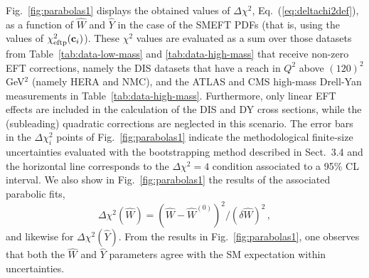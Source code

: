 \documentclass[withindex,glossary]{cam-thesis}
\begin{document}
Fig.~\ref{fig:parabolas1} displays the obtained values of $\Delta \chi^2$, Eq.~(\ref{eq:deltachi2def}),
as a function of $\hat{W}$ 
and $\hat{Y}$ in the case of the SMEFT PDFs (that is, using
the values of $\chi_{\rm eftp}^2({\mathbf{c}_i})$).
%
These $\chi^2$ values are  evaluated as a sum over
those datasets from Table~\ref{tab:data-low-mass} and
\ref{tab:data-high-mass} that receive
non-zero EFT corrections, namely the DIS datasets that
have a reach in  $Q^2$ above $(120)^2$ GeV$^2$ (namely HERA and NMC), and the ATLAS and CMS high-mass Drell-Yan measurements in Table~\ref{tab:data-high-mass}.
%
Furthermore, only linear EFT effects are included in the calculation of the DIS and DY 
cross sections, while the (subleading) quadratic corrections are neglected
in this scenario.
%
The error bars in the $\Delta\chi^2_i$ points of
Fig.~\ref{fig:parabolas1} indicate the
methodological finite-size
uncertainties evaluated with the bootstrapping method described in
Sect.~3.4  and the horizontal line corresponds to the $\Delta \chi^2=4$ condition associated
to a 95\% CL interval.
%
We also show in Fig.~\ref{fig:parabolas1} the results of the associated parabolic fits,
\begin{equation}
\label{eq:parabolicfit}
\Delta \chi^2(\hat{W}) = \left( \hat{W} - \hat{W}^{(0)} \right)^2 / \left( \delta \hat{W} \right)^2 \, ,
\end{equation}
and likewise for $\Delta \chi^2(\hat{Y})$.
%
From the results in Fig.~\ref{fig:parabolas1}, one observes that
both the $\hat{W}$ and $\hat{Y}$ parameters agree with the SM expectation
within uncertainties.
\end{document}
